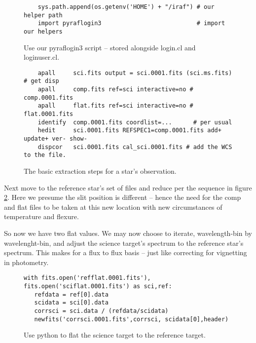 \begin{figure}
\begingroup \fontsize{10pt}{10pt}
\selectfont
{\color{darkred}
\begin{verbatim} 
    sys.path.append(os.getenv('HOME') + "/iraf") # our helper path
    import pyraflogin3                           # import our helpers
\end{verbatim}
}
\endgroup
\caption{Use our pyraflogin3 script -- stored alongside login.cl and
loginuser.cl.}
\label{fig:pyraflogin3}
\end{figure}


\begin{figure}
\begingroup \fontsize{10pt}{10pt}
\selectfont
{\color{darkred}
\begin{verbatim} 
    apall     sci.fits output = sci.0001.fits (sci.ms.fits) # get disp
    apall     comp.fits ref=sci interactive=no # comp.0001.fits
    apall     flat.fits ref=sci interactive=no # flat.0001.fits 
    identify  comp.0001.fits coordlist=...      # per usual
    hedit     sci.0001.fits REFSPEC1=comp.0001.fits add+ update+ ver- show-
    dispcor   sci.0001.fits cal_sci.0001.fits # add the WCS to the file.
\end{verbatim}
}
\endgroup
\caption{The basic extraction steps for a star's observation.}
\label{fig:SpecRedSteps}
\end{figure}


Next move to the reference star's set of files and reduce per the
sequence in figure \ref{fig:SpecRedSteps}. Here we presume the slit
position is different -- hence the need for the comp and flat files to
be taken at this new location with new circumstances of temperature
and flexure.

So now we have two flat values. We may now choose to iterate,
wavelength-bin by wavelenght-bin, and adjust the science target's
spectrum to the reference star's spectrum. This makes for a flux to
flux basis -- just like correcting for vignetting in photometry.

\begin{figure}
\begingroup \fontsize{10pt}{10pt}
\selectfont
{\color{darkred}
\begin{verbatim} 
with fits.open('refflat.0001.fits'), fits.open('sciflat.0001.fits') as sci,ref:
   refdata = ref[0].data
   scidata = sci[0].data
   corrsci = sci.data / (refdata/scidata)
   newfits('corrsci.0001.fits',corrsci, scidata[0],header)
\end{verbatim}
} %
\endgroup
\caption{Use python to flat the science target to the reference target.}
\label{fig:FlatSciRef}
\end{figure}

